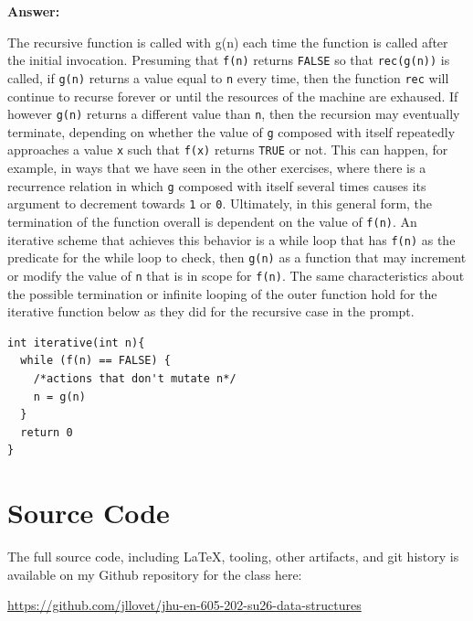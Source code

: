 \documentclass[10pt,letterpaper,final]{report}
\begin{document}
\noindent\textbf{Answer:}

The recursive function is called with g(n) each time the function is called after the initial invocation. Presuming that \verb|f(n)| returns \verb|FALSE| so that \verb|rec(g(n))| is called, if \verb|g(n)| returns a value equal to \verb|n| every time, then the function \verb|rec| will continue to recurse forever or until the resources of the machine are exhaused. If however \verb|g(n)| returns a different value than \verb|n|, then the recursion may eventually terminate, depending on whether the value of \verb|g| composed with itself repeatedly approaches a value \verb|x| such that \verb|f(x)| returns \verb|TRUE| or not. This can happen, for example, in ways that we have seen in the other exercises, where there is a recurrence relation in which \verb|g| composed with itself several times causes its argument to decrement towards \verb|1| or \verb|0|. Ultimately, in this general form, the termination of the function overall is dependent on the value of \verb|f(n)|. An iterative scheme that achieves this behavior is a while loop that has \verb|f(n)| as the predicate for the while loop to check, then \verb|g(n)| as a function that may increment or modify the value of \verb|n| that is in scope for \verb|f(n)|. The same characteristics about the possible termination or infinite looping of the outer function hold for the iterative function below as they did for the recursive case in the prompt.


\begin{mdframed}
\begin{verbatim}
int iterative(int n){
  while (f(n) == FALSE) {
    /*actions that don't mutate n*/
    n = g(n)
  }
  return 0
}
\end{verbatim}
\end{mdframed}


\pagebreak

\section*{Source Code}
The full source code, including LaTeX, tooling, other artifacts, and git history is available on my Github repository for the class here:
\begin{center}
  \url{https://github.com/jllovet/jhu-en-605-202-su26-data-structures}
\end{center}

\printbibliography
\end{document}
